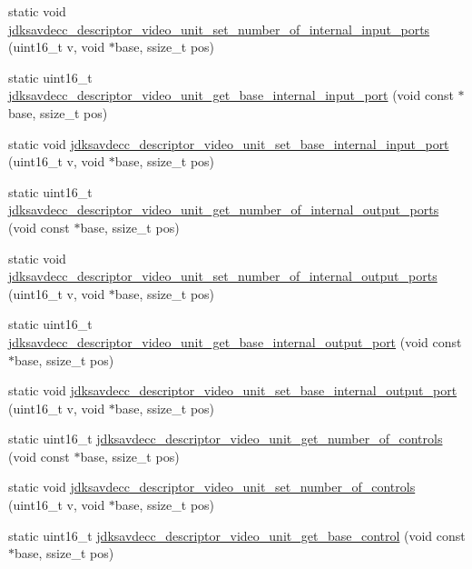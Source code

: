 \begin{DoxyCompactItemize}
static void \hyperlink{group__descriptor__video_gabe26a58af79c40668681bfec808a5641}{jdksavdecc\+\_\+descriptor\+\_\+video\+\_\+unit\+\_\+set\+\_\+number\+\_\+of\+\_\+internal\+\_\+input\+\_\+ports} (uint16\+\_\+t v, void $\ast$base, ssize\+\_\+t pos)
\item 
static uint16\+\_\+t \hyperlink{group__descriptor__video_ga74c6cd94fbede6dde355592e553ecb0e}{jdksavdecc\+\_\+descriptor\+\_\+video\+\_\+unit\+\_\+get\+\_\+base\+\_\+internal\+\_\+input\+\_\+port} (void const $\ast$base, ssize\+\_\+t pos)
\item 
static void \hyperlink{group__descriptor__video_ga8f11f3bbc432e33c861962027b0fc2f0}{jdksavdecc\+\_\+descriptor\+\_\+video\+\_\+unit\+\_\+set\+\_\+base\+\_\+internal\+\_\+input\+\_\+port} (uint16\+\_\+t v, void $\ast$base, ssize\+\_\+t pos)
\item 
static uint16\+\_\+t \hyperlink{group__descriptor__video_gaeb69c726c35d20fe51305d189420c97f}{jdksavdecc\+\_\+descriptor\+\_\+video\+\_\+unit\+\_\+get\+\_\+number\+\_\+of\+\_\+internal\+\_\+output\+\_\+ports} (void const $\ast$base, ssize\+\_\+t pos)
\item 
static void \hyperlink{group__descriptor__video_gaadfcaa48da3e80f92841c82bb0b3926b}{jdksavdecc\+\_\+descriptor\+\_\+video\+\_\+unit\+\_\+set\+\_\+number\+\_\+of\+\_\+internal\+\_\+output\+\_\+ports} (uint16\+\_\+t v, void $\ast$base, ssize\+\_\+t pos)
\item 
static uint16\+\_\+t \hyperlink{group__descriptor__video_ga79b99365cee06af06fb977d766f18a37}{jdksavdecc\+\_\+descriptor\+\_\+video\+\_\+unit\+\_\+get\+\_\+base\+\_\+internal\+\_\+output\+\_\+port} (void const $\ast$base, ssize\+\_\+t pos)
\item 
static void \hyperlink{group__descriptor__video_ga5fbf31a824651ca8a4a379e8457f13dd}{jdksavdecc\+\_\+descriptor\+\_\+video\+\_\+unit\+\_\+set\+\_\+base\+\_\+internal\+\_\+output\+\_\+port} (uint16\+\_\+t v, void $\ast$base, ssize\+\_\+t pos)
\item 
static uint16\+\_\+t \hyperlink{group__descriptor__video_ga2b83539def71e89d6893bb6ceb2782b7}{jdksavdecc\+\_\+descriptor\+\_\+video\+\_\+unit\+\_\+get\+\_\+number\+\_\+of\+\_\+controls} (void const $\ast$base, ssize\+\_\+t pos)
\item 
static void \hyperlink{group__descriptor__video_ga3a3d80d342ac30f0b9932f327e2e7c5b}{jdksavdecc\+\_\+descriptor\+\_\+video\+\_\+unit\+\_\+set\+\_\+number\+\_\+of\+\_\+controls} (uint16\+\_\+t v, void $\ast$base, ssize\+\_\+t pos)
\item 
static uint16\+\_\+t \hyperlink{group__descriptor__video_ga85e5741af25e79ba72d650bf6879c71c}{jdksavdecc\+\_\+descriptor\+\_\+video\+\_\+unit\+\_\+get\+\_\+base\+\_\+control} (void const $\ast$base, ssize\+\_\+t pos)

\end{DoxyCompactItemize}
